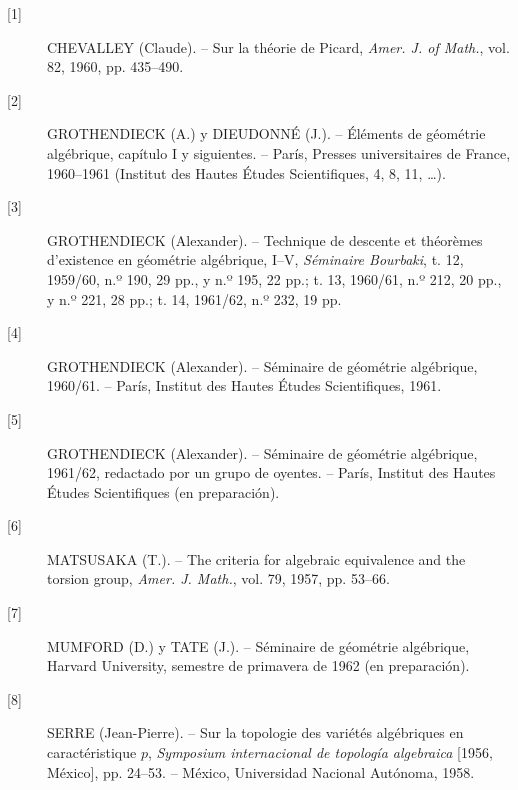 \begin{description}
\item[{[1]}] CHEVALLEY (Claude). -- Sur la théorie de Picard,
\emph{Amer. J. of Math.}, vol. 82, 1960, pp. 435--490.

\item[{[2]}] GROTHENDIECK (A.) y DIEUDONNÉ (J.). -- Éléments de géométrie
algébrique, capítulo I y siguientes. -- París, Presses universitaires de
France, 1960--1961 (Institut des Hautes Études Scientifiques, 4, 8, 11,
\ldots).

\item[{[3]}] GROTHENDIECK (Alexander). -- Technique de descente et théorèmes
d'existence en géométrie algébrique, I--V, \emph{Séminaire Bourbaki}, t. 12,
1959/60, n.º 190, 29 pp., y n.º 195, 22 pp.; t. 13, 1960/61, n.º 212,
20 pp., y n.º 221, 28 pp.; t. 14, 1961/62, n.º 232, 19 pp.

\item[{[4]}] GROTHENDIECK (Alexander). -- Séminaire de géométrie algébrique,
1960/61. -- París, Institut des Hautes Études Scientifiques, 1961.

\item[{[5]}] GROTHENDIECK (Alexander). -- Séminaire de géométrie algébrique,
1961/62, redactado por un grupo de oyentes. -- París, Institut des Hautes Études
Scientifiques (en preparación).

\item[{[6]}] MATSUSAKA (T.). -- The criteria for algebraic equivalence and the
torsion group, \emph{Amer. J. Math.}, vol. 79, 1957, pp. 53--66.

\item[{[7]}] MUMFORD (D.) y TATE (J.). -- Séminaire de géométrie algébrique,
Harvard University, semestre de primavera de 1962 (en preparación).

\item[{[8]}] SERRE (Jean-Pierre). -- Sur la topologie des variétés algébriques
en caractéristique $p$, \emph{Symposium internacional de topología algebraica}
[1956, México], pp. 24--53. -- México, Universidad Nacional Autónoma, 1958.
\end{description}
